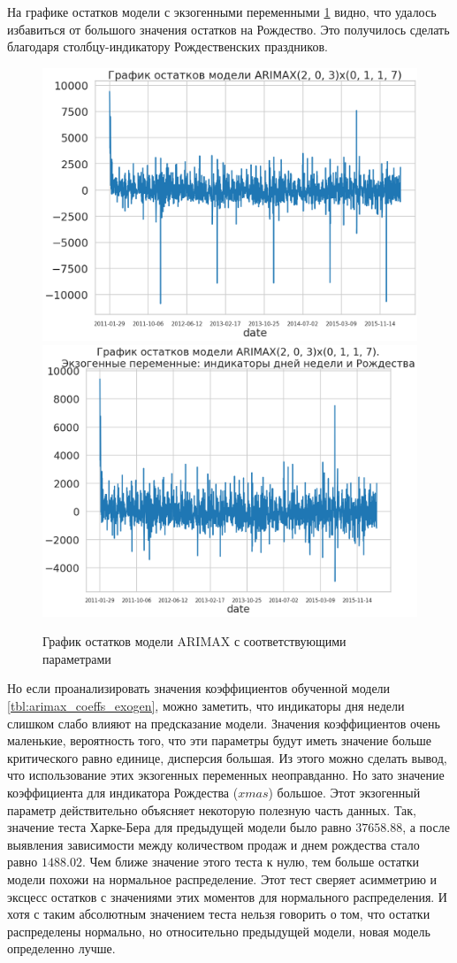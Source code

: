 На графике остатков модели с экзогенными переменными \ref{img:arimax_resid} видно, что удалось избавиться
от большого значения остатков на Рождество. Это получилось сделать благодаря
столбцу-индикатору Рождественских праздников.

\def\figurename{Рис}
\begin{figure}[t]
	\centering
	\includegraphics[width=0.4\columnwidth]{./img/arimax_resid.png}
	\includegraphics[width=0.4\columnwidth]{./img/arimax_resid_with_xmas.png}
	\caption{График остатков модели ARIMAX с соответствующими параметрами}
	\label{img:arimax_resid}
\end{figure}

Но если проанализировать значения коэффициентов обученной модели \ref{tbl:arimax_coeffs_exogen},
можно заметить, что индикаторы дня недели слишком слабо влияют на предсказание модели.
Значения коэффициентов очень маленькие, вероятность того, что эти параметры будут иметь
значение больше критического равно единице, дисперсия большая. Из этого можно сделать вывод,
что использование этих экзогенных переменных неоправданно. Но зато значение коэффициента
для индикатора Рождества ($ xmas $) большое. Этот экзогенный параметр
действительно объясняет некоторую полезную часть данных. Так, значение теста Харке-Бера
для предыдущей модели было равно $ 37658.88 $, а после выявления зависимости между количеством продаж
и днем рождества стало равно $ 1488.02 $. Чем ближе значение этого теста к нулю, тем больше остатки
модели похожи на нормальное распределение. Этот тест сверяет асимметрию и эксцесс остатков с
значениями этих моментов для нормального распределения. И хотя с таким абсолютным значением
теста нельзя говорить о том, что остатки распределены нормально, но относительно предыдущей
модели, новая модель определенно лучше.

